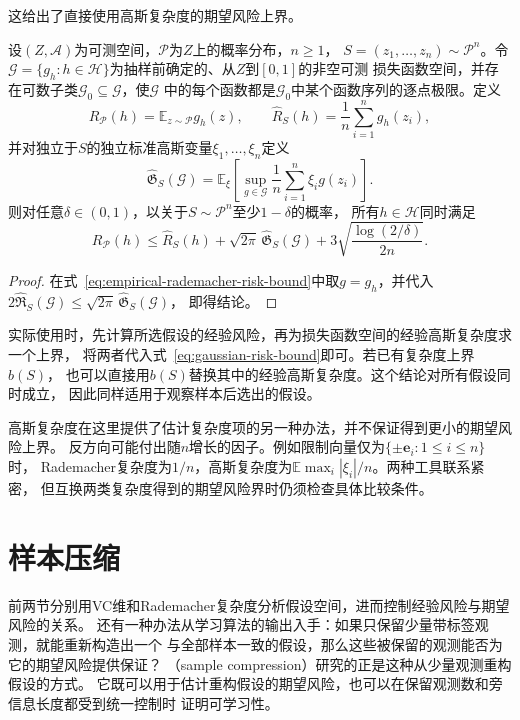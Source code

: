 这给出了直接使用高斯复杂度的期望风险上界。

\begin{theorem}[高斯复杂度给出的期望风险上界]
\label{thm:gaussian-risk-bound}
设$(Z,\mathcal A)$为可测空间，$\mathcal P$为$Z$上的概率分布，$n\geq1$，
$S=(z_1,\ldots,z_n)\sim\mathcal P^n$。令
$\mathcal G=\{g_h:h\in\mathcal H\}$为抽样前确定的、从$Z$到$[0,1]$的非空可测
损失函数空间，并存在可数子类$\mathcal G_0\subseteq\mathcal G$，使$\mathcal G$
中的每个函数都是$\mathcal G_0$中某个函数序列的逐点极限。定义
\[
 R_{\mathcal P}(h)=\mathbb E_{z\sim\mathcal P}g_h(z),\qquad
 \hat R_S(h)=\frac1n\sum_{i=1}^n g_h(z_i),
\]
并对独立于$S$的独立标准高斯变量$\xi_1,\ldots,\xi_n$定义
\[
 \widehat{\mathfrak G}_S(\mathcal G)
 =\mathbb E_\xi\left[\sup_{g\in\mathcal G}
   \frac1n\sum_{i=1}^n\xi_i g(z_i)\right].
\]
则对任意$\delta\in(0,1)$，以关于$S\sim\mathcal P^n$至少$1-\delta$的概率，
所有$h\in\mathcal H$同时满足
\begin{equation}
 R_{\mathcal P}(h)\leq\hat R_S(h)
 +\sqrt{2\pi}\,\widehat{\mathfrak G}_S(\mathcal G)
 +3\sqrt{\frac{\log(2/\delta)}{2n}}.
 \label{eq:gaussian-risk-bound}
\end{equation}
\end{theorem}

\begin{proof}
在式~\eqref{eq:empirical-rademacher-risk-bound}中取$g=g_h$，并代入
$2\widehat{\mathfrak R}_S(\mathcal G)\leq\sqrt{2\pi}\,\widehat{\mathfrak G}_S(\mathcal G)$，
即得结论。
\end{proof}

实际使用时，先计算所选假设的经验风险，再为损失函数空间的经验高斯复杂度求一个上界，
将两者代入式~\eqref{eq:gaussian-risk-bound}即可。若已有复杂度上界$b(S)$，
也可以直接用$b(S)$替换其中的经验高斯复杂度。这个结论对所有假设同时成立，
因此同样适用于观察样本后选出的假设。

高斯复杂度在这里提供了估计复杂度项的另一种办法，并不保证得到更小的期望风险上界。
反方向可能付出随$n$增长的因子。例如限制向量仅为$\{\pm\bm e_i:1\leq i\leq n\}$时，
Rademacher复杂度为$1/n$，高斯复杂度为$\mathbb E\max_i|\xi_i|/n$。两种工具联系紧密，
但互换两类复杂度得到的期望风险界时仍须检查具体比较条件。

\section{样本压缩}
\label{sec:sample-compression}

前两节分别用VC维和Rademacher复杂度分析假设空间，进而控制经验风险与期望风险的关系。
还有一种办法从学习算法的输出入手：如果只保留少量带标签观测，就能重新构造出一个
与全部样本一致的假设，那么这些被保留的观测能否为它的期望风险提供保证？
（sample compression）研究的正是这种从少量观测重构假设的方式。
它既可以用于估计重构假设的期望风险，也可以在保留观测数和旁信息长度都受到统一控制时
证明可学习性。

